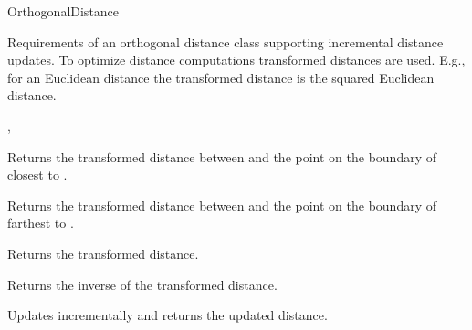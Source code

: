 

\begin{ccRefConcept}{OrthogonalDistance}


\ccDefinition
  
Requirements of an orthogonal distance class supporting incremental distance updates.
To optimize distance computations transformed distances are used. 
E.g., for an Euclidean distance the transformed distance is the squared Euclidean distance.

\ccRefines


\ccHasModels

,\\

\ccTypes


\ccCreation
{}  %


\ccOperations


{Returns the transformed distance between  and
the point on the boundary of  closest to .}

{Returns the transformed distance between  and
the point on the boundary of  farthest to .}

 {Returns the transformed distance.}

 {Returns the inverse of the transformed distance.}

 {Updates 
 incrementally and returns the updated distance.}




\end{ccRefConcept}


